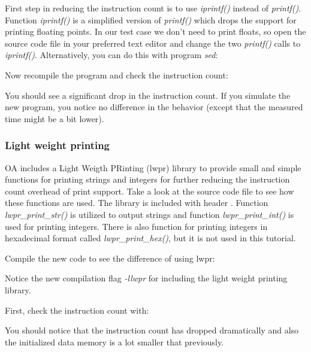 \documentclass[a4paper,twoside]{tceusermanual}
\begin{document}
First step in reducing the instruction count is to use
\textit{iprintf()} instead of \textit{printf()}. Function
\textit{iprintf()} is a simplified version of \textit{printf()} which
drops the support for printing floating points. In our test case we
don't need to print floats, so open the source code file
 in your preferred text editor and change the two
\textit{printf()} calls to \textit{iprintf()}. Alternatively, you can
do this with program \textit{sed}:


Now recompile the program and check the instruction count:



You should see a significant drop in the instruction count. If you
simulate the new program, you notice no difference in the behavior
(except that the measured time might be a bit lower).

\subsubsection{Light weight printing}

OA includes a Light Weigth PRinting (lwpr) library to provide small
and simple functions for printing strings and integers for further
reducing the instruction count overhead of print support. Take a look
at the source code file  to see how these
functions are used. The library is included with header .
Function \textit{lwpr\_print\_str()} is utilized to output strings and
function \textit{lwpr\_print\_int()} is used for printing
integers. There is also function for printing integers in hexadecimal
format called \textit{lwpr\_print\_hex()}, but it is not used in this
tutorial.

Compile the new code to see the difference of using lwpr:


Notice the new compilation flag \textit{-llwpr} for including the light
weight printing library.

First, check the instruction count with:


You should notice that the instruction count has dropped dramatically
and also the initialized data memory is a lot smaller that previously.
\end{document}
